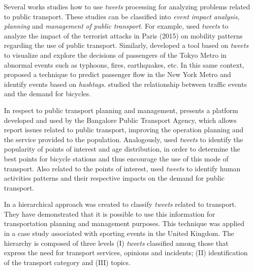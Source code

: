 \documentclass[runningheads]{llncs}
\begin{document}
%
Several works studies how to use \textit{tweets} processing for analyzing problems related to public transport. These studies can be classified into \emph{event impact analysis}, \emph{planning} and \emph{management of public transport}. For example, \cite{Wen2016} used \textit{tweets} to analyze the impact of the terrorist attacks in Paris (2015) on mobility patterns regarding the use of public transport. Similarly, \cite{Itoh2016} developed a tool based on \textit{tweets} to visualize and explore the decisions of passengers of the Tokyo Metro in abnormal events such as typhoons, fires, earthquakes, etc. In this same context, \cite{Ni2016} proposed a technique to predict passenger flow in the New York Metro and identify events based on \textit{hashtags}. \cite{Chen2016} studied the relationship between traffic events and the demand for bicycles.

In respect to public transport planning and management, \cite{Mukherjee2015} presents a platform developed and used by the Bangalore Public Transport Agency, which allows report issues related to public transport, improving the operation planning and the service provided to the population. Analogously, \cite{Gutev2016} used \textit{tweets} to identify the popularity of points of interest and age distribution, in order to determine the best points for bicycle stations and thus encourage the use of this mode of transport. Also related to the points of interest, \cite{Maghrebi2015} used \textit{tweets} to identify human activities patterns and their respective impacts on the demand for public transport.

In \cite{Gal-Tzur2014} a hierarchical approach was created to classify \textit{tweets} related to transport. They have demonstrated that it is possible to use this information for transportation planning and management purposes. This technique was applied in a case study associated with sporting events in the United Kingdom. The hierarchy is composed of three levels (I) \textit{tweets} classified among those that express the need for transport services, opinions and incidents; (II) identification of the transport category and (III) topics.
\end{document}
